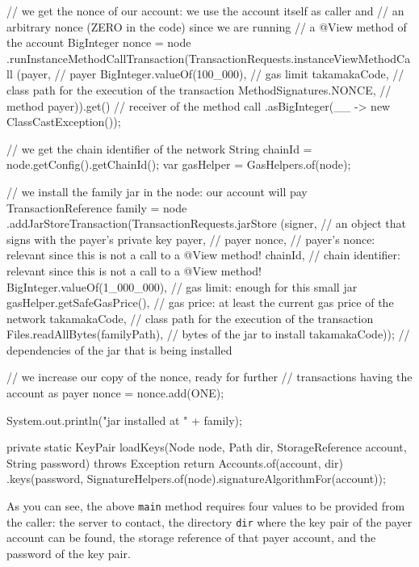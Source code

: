 \begin{codebox}
\begin{javalst}
{{{      // we get the nonce of our account: we use the account itself as caller and
      // an arbitrary nonce (ZERO in the code) since we are running
      // a @View method of the account
      BigInteger nonce = node
      .runInstanceMethodCallTransaction(TransactionRequests.instanceViewMethodCall
      (payer, // payer
      BigInteger.valueOf(100_000), // gas limit
      takamakaCode, // class path for the execution of the transaction
      MethodSignatures.NONCE, // method
      payer)).get() // receiver of the method call
      .asBigInteger(__ -> new ClassCastException());

      // we get the chain identifier of the network
      String chainId = node.getConfig().getChainId();
      var gasHelper = GasHelpers.of(node);

      // we install the family jar in the node: our account will pay
      TransactionReference family = node
      .addJarStoreTransaction(TransactionRequests.jarStore
      (signer, // an object that signs with the payer's private key
      payer, // payer
      nonce, // payer's nonce: relevant since this is not a call to a @View method!
      chainId, // chain identifier: relevant since this is not a call to a @View method!
      BigInteger.valueOf(1_000_000), // gas limit: enough for this small jar
      gasHelper.getSafeGasPrice(), // gas price: at least the current gas price of the network
      takamakaCode, // class path for the execution of the transaction
      Files.readAllBytes(familyPath), // bytes of the jar to install
      takamakaCode)); // dependencies of the jar that is being installed

      // we increase our copy of the nonce, ready for further
      // transactions having the account as payer
      nonce = nonce.add(ONE);

      System.out.println("jar installed at " + family);
    }
  }

  private static KeyPair loadKeys(Node node, Path dir, StorageReference account, String password) throws Exception {
    return Accounts.of(account, dir)
    .keys(password, SignatureHelpers.of(node).signatureAlgorithmFor(account));
  }
}
\end{javalst}\end{codebox}
%
As you can see, the above \texttt{main} method requires four values to be provided from the caller:
the server to contact,
the directory \texttt{dir} where the key pair of the payer account can be found,
the storage reference of that payer account, and the password of the key pair.

